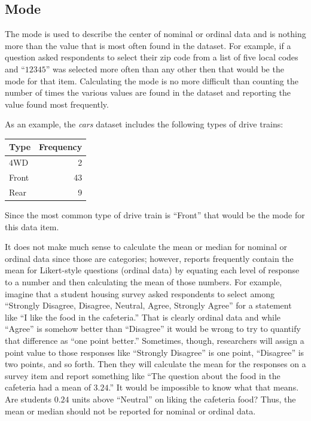 \subsection{Mode}\label{lab03_mode}
The mode is used to describe the center of nominal or ordinal data and is nothing more than the value that is most often found in the dataset. For example, if a question asked respondents to select their zip code from a list of five local codes and ``$ 12345 $'' was selected more often than any other then that would be the mode for that item. Calculating the mode is no more difficult than counting the number of times the various values are found in the dataset and reporting the value found most frequently. 

As an example, the \textit{cars} dataset includes the following types of drive trains:

\begin{center}
  \begin{tabular}{lr}
    \hline 
    \textbf{Type} & \textbf{Frequency} \\ 
    \hline 
    $ 4 $WD & 2 \\ 
    Front & 43 \\ 
    Rear & 9 \\ 
    \hline 
  \end{tabular}
\end{center}

Since the most common type of drive train is ``Front'' that would be the mode for this data item.

It does not make much sense to calculate the mean or median for nominal or ordinal data since those are categories; however, reports frequently contain the mean for Likert-style questions (ordinal data) by equating each level of response to a number and then calculating the mean of those numbers. For example, imagine that a student housing survey asked respondents to select among ``Strongly Disagree, Disagree, Neutral, Agree, Strongly Agree'' for a statement like ``I like the food in the cafeteria.'' That is clearly ordinal data and while ``Agree'' is somehow better than ``Disagree'' it would be wrong to try to quantify that difference as ``one point better.'' Sometimes, though, researchers will assign a point value to those responses like ``Strongly Disagree'' is one point, ``Disagree'' is two points, and so forth. Then they will calculate the mean for the responses on a survey item and report something like ``The question about the food in the cafeteria had a mean of $ 3.24 $.'' It would be impossible to know what that means. Are students $ 0.24 $ units above ``Neutral'' on liking the cafeteria food? Thus, the mean or median should not be reported for nominal or ordinal data.

